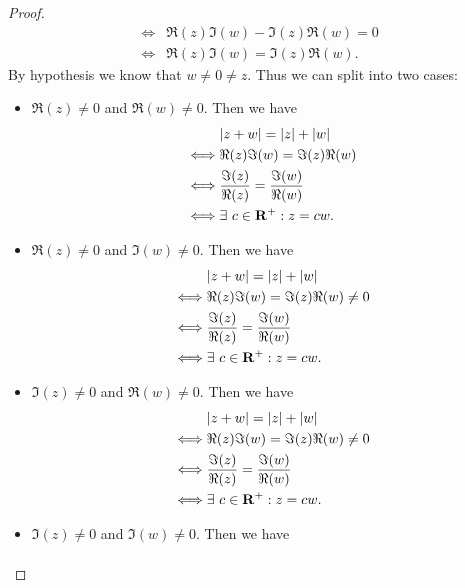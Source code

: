 \begin{proof}
\begin{align*}
        \iff & \Re(z) \Im(w) - \Im(z) \Re(w) = 0                                                                               \\
        \iff & \Re(z) \Im(w) = \Im(z) \Re(w).
    \end{align*}
    By hypothesis we know that \(w \neq 0 \neq z\).
    Thus we can split into two cases:
    \begin{itemize}
        \item \(\Re(z) \neq 0\) and \(\Re(w) \neq 0\).
              Then we have
              \begin{align*}
                       & \abs*{z + w} = \abs*{z} + \abs*{w}            \\
                  \iff & \Re(z) \Im(w) = \Im(z) \Re(w)                 \\
                  \iff & \frac{\Im(z)}{\Re(z)} = \frac{\Im(w)}{\Re(w)} \\
                  \iff & \exists\ c \in \mathbf{R}^+ : z = cw.
              \end{align*}
        \item \(\Re(z) \neq 0\) and \(\Im(w) \neq 0\).
              Then we have
              \begin{align*}
                       & \abs*{z + w} = \abs*{z} + \abs*{w}            \\
                  \iff & \Re(z) \Im(w) = \Im(z) \Re(w) \neq 0          \\
                  \iff & \frac{\Im(z)}{\Re(z)} = \frac{\Im(w)}{\Re(w)} \\
                  \iff & \exists\ c \in \mathbf{R}^+ : z = cw.
              \end{align*}
        \item \(\Im(z) \neq 0\) and \(\Re(w) \neq 0\).
              Then we have
              \begin{align*}
                       & \abs*{z + w} = \abs*{z} + \abs*{w}            \\
                  \iff & \Re(z) \Im(w) = \Im(z) \Re(w) \neq 0          \\
                  \iff & \frac{\Im(z)}{\Re(z)} = \frac{\Im(w)}{\Re(w)} \\
                  \iff & \exists\ c \in \mathbf{R}^+ : z = cw.
              \end{align*}
        \item \(\Im(z) \neq 0\) and \(\Im(w) \neq 0\).
              Then we have
              \begin{align*}

\end{align*}
\end{itemize}
\end{proof}
